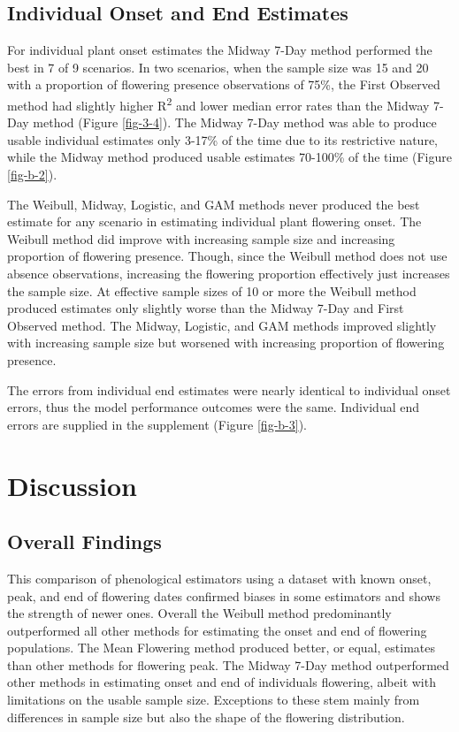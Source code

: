 \subsection{Individual Onset and End Estimates}

For individual plant onset estimates the Midway 7-Day method performed the best in 7 of 9 scenarios. In two scenarios, when the sample size was 15 and 20 with a proportion of flowering presence observations of 75\%, the First Observed method had slightly higher R\textsuperscript{2} and lower median error rates than the Midway 7-Day method (Figure \ref{fig-3-4}). The Midway 7-Day method was able to produce usable individual estimates only 3-17\% of the time due to its restrictive nature, while the Midway method produced usable estimates 70-100\% of the time (Figure \ref{fig-b-2}).

The Weibull, Midway, Logistic, and GAM methods never produced the best estimate for any scenario in estimating individual plant flowering onset. The Weibull method did improve with increasing sample size and increasing proportion of flowering presence. Though, since the Weibull method does not use absence observations, increasing the flowering proportion effectively just increases the sample size. At effective sample sizes of 10 or more the Weibull method produced estimates only slightly worse than the Midway 7-Day and First Observed method. The Midway, Logistic, and GAM methods improved slightly with increasing sample size but worsened with increasing proportion of flowering presence. 

The errors from individual end estimates were nearly identical to individual onset errors, thus the model performance outcomes were the same. Individual end errors are supplied in the supplement (Figure \ref{fig-b-3}). 

\section{Discussion}

\subsection{Overall Findings}

This comparison of phenological estimators using a dataset with known onset, peak, and end of flowering dates confirmed biases in some estimators and shows the strength of newer ones. Overall the Weibull method predominantly outperformed all other methods for estimating the onset and end of flowering populations. The Mean Flowering method produced better, or equal, estimates than other methods for flowering peak. The Midway 7-Day method outperformed other methods in estimating onset and end of individuals flowering, albeit with limitations on the usable sample size. Exceptions to these stem mainly from differences in sample size but also the shape of the flowering distribution.

